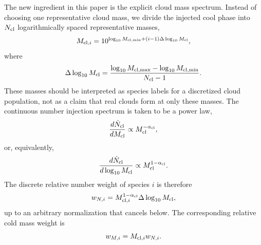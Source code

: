 The new ingredient in this paper is the explicit cloud mass spectrum.
Instead of choosing one representative cloud mass, we divide the injected cool phase into $N_{\rm cl}$ logarithmically spaced representative masses,
\begin{equation}
M_{{\rm cl},i}
=
10^{\log_{10}M_{\rm cl,min}+(i-1)\Delta\log_{10}M_{\rm cl}},
\end{equation}
where
\begin{equation}
\Delta\log_{10}M_{\rm cl}
=
\frac{\log_{10}M_{\rm cl,max}-\log_{10}M_{\rm cl,min}}{N_{\rm cl}-1}.
\end{equation}
These masses should be interpreted as species labels for a discretized cloud population, not as a claim that real clouds form at only these masses.
The continuous number injection spectrum is taken to be a power law,
\begin{equation}
\frac{d\dot{N}_{\rm cl}}{dM_{\rm cl}}
\propto
M_{\rm cl}^{-\alpha_{\rm cl}},
\end{equation}
or, equivalently,
\begin{equation}
\frac{d\dot{N}_{\rm cl}}{d\log_{10} M_{\rm cl}}
\propto
M_{\rm cl}^{1-\alpha_{\rm cl}}.
\end{equation}
The discrete relative number weight of species $i$ is therefore
\begin{equation}
w_{N,i}
=
M_{{\rm cl},i}^{1-\alpha_{\rm cl}}\Delta\log_{10} M_{\rm cl},
\end{equation}
up to an arbitrary normalization that cancels below.
The corresponding relative cold mass weight is
\begin{equation}
w_{M,i}
=
M_{{\rm cl},i}w_{N,i}.
\end{equation}

